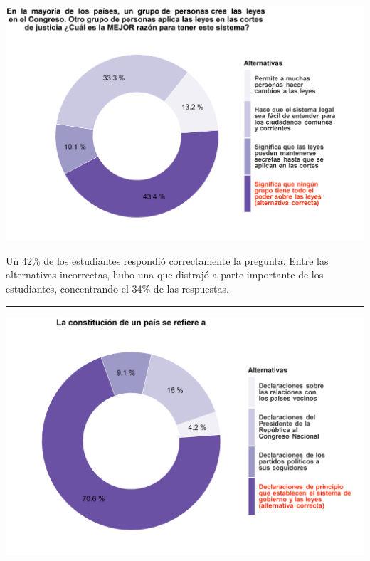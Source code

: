 \documentclass[
  14pt,
]{book}
\let\origfigure\figure
\let\endorigfigure\endfigure
\renewenvironment{figure}[1][2] {
  \expandafter\origfigure\expandafter[H]
} {
  \endorigfigure
}
\begin{document}
\begin{figure}[!ht]

{\centering \includegraphics[width=0.8\linewidth,]{images/ccivico_1} 

}

\caption{Razones para crear leyes en el Congreso}\label{fig:unnamed-chunk-5}
\end{figure}

Un 42\% de los estudiantes respondió correctamente la pregunta. Entre las alternativas incorrectas, hubo una que distrajó a parte importante de los estudiantes, concentrando el 34\% de las respuestas.

\begin{center}\rule{0.5\linewidth}{0.5pt}\end{center}

\begin{figure}[!ht]

{\centering \includegraphics[width=0.8\linewidth,]{images/ccivico_2} 

}

\caption{Definiciones de constitución}\label{fig:unnamed-chunk-6}
\end{figure}
\end{document}
